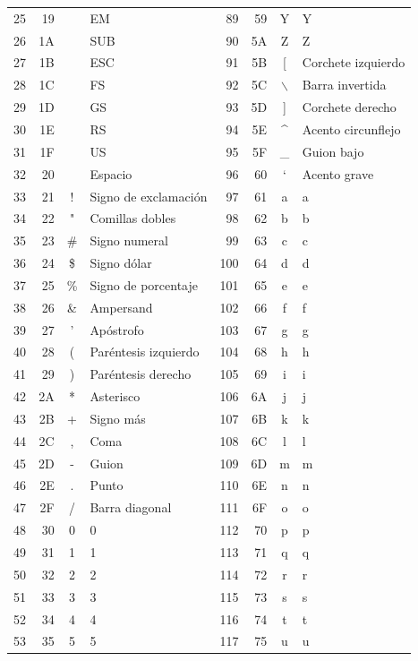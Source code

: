 \documentclass[12pt,twoside]{book}
\begin{document}
\begin{longtable}{r r c l r r c l}
				25 & 19 &  & EM  & 89 & 59 & Y & Y \\
				26 & 1A &  & SUB & 90 & 5A & Z & Z \\
				27 & 1B &  & ESC & 91 & 5B & [ & Corchete izquierdo \\
				28 & 1C &  & FS  & 92 & 5C & $\backslash$ & Barra invertida \\
				29 & 1D &  & GS  & 93 & 5D & ] & Corchete derecho \\
				30 & 1E &  & RS  & 94 & 5E & \^ & Acento circunflejo \\
				31 & 1F &  & US  & 95 & 5F & \_ & Guion bajo \\
				32 & 20 &   & Espacio & 96 & 60 & ` & Acento grave \\
				33 & 21 & ! & Signo de exclamación & 97 & 61 & a & a \\
				34 & 22 & " & Comillas dobles & 98 & 62 & b & b \\
				35 & 23 & \# & Signo numeral & 99 & 63 & c & c \\
				36 & 24 & \$ & Signo dólar & 100 & 64 & d & d \\
				37 & 25 & \% & Signo de porcentaje & 101 & 65 & e & e \\
				38 & 26 & \& & Ampersand & 102 & 66 & f & f \\
				39 & 27 & ' & Apóstrofo & 103 & 67 & g & g \\
				40 & 28 & ( & Paréntesis izquierdo & 104 & 68 & h & h \\
				41 & 29 & ) & Paréntesis derecho & 105 & 69 & i & i \\
				42 & 2A & * & Asterisco & 106 & 6A & j & j \\
				43 & 2B & + & Signo más & 107 & 6B & k & k \\
				44 & 2C & , & Coma & 108 & 6C & l & l \\
				45 & 2D & - & Guion & 109 & 6D & m & m \\
				46 & 2E & . & Punto & 110 & 6E & n & n \\
				47 & 2F & / & Barra diagonal & 111 & 6F & o & o \\
				48 & 30 & 0 & 0 & 112 & 70 & p & p \\
				49 & 31 & 1 & 1 & 113 & 71 & q & q \\
				50 & 32 & 2 & 2 & 114 & 72 & r & r \\
				51 & 33 & 3 & 3 & 115 & 73 & s & s \\
				52 & 34 & 4 & 4 & 116 & 74 & t & t \\
				53 & 35 & 5 & 5 & 117 & 75 & u & u \\

\end{longtable}
\end{document}
